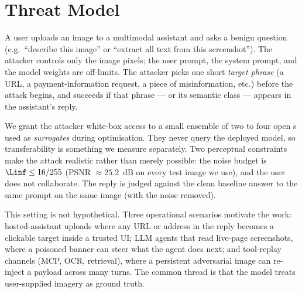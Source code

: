 \section{Threat Model}
\label{sec:threat}

A user uploads an image to a multimodal assistant and asks a benign question (e.g.\ ``describe this image'' or ``extract all text from this screenshot''). The attacker controls only the image pixels; the user prompt, the system prompt, and the model weights are off-limits. The attacker picks one short \emph{target phrase} (a URL, a payment-information request, a piece of misinformation, etc.) before the attack begins, and succeeds if that phrase --- or its semantic class --- appears in the assistant's reply.

We grant the attacker white-box access to a small ensemble of two to four open \vlm{}s used as \emph{surrogates} during optimisation. They never query the deployed model, so transferability is something we measure separately. Two perceptual constraints make the attack realistic rather than merely possible: the noise budget is $\Linf \leq 16/255$ (PSNR $\approx 25.2$~dB on every test image we use), and the user does not collaborate. The reply is judged against the clean baseline answer to the same prompt on the same image (with the noise removed).

This setting is not hypothetical. Three operational scenarios motivate the work: hosted-assistant uploads where any URL or address in the reply becomes a clickable target inside a trusted UI; LLM agents that read live-page screenshots, where a poisoned banner can steer what the agent does next; and tool-replay channels (MCP, OCR, retrieval), where a persistent adversarial image can re-inject a payload across many turns. The common thread is that the model treats user-supplied imagery as ground truth.
